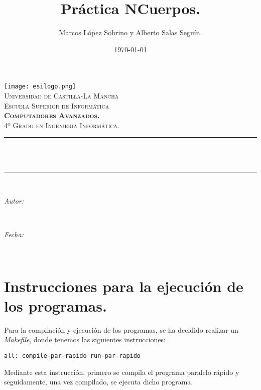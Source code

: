 \documentclass[11pt]{article}
\title{Práctica NCuerpos.}							%
\author{Marcos López Sobrino y Alberto Salas Seguín.}							%
\date{\today}											%
\makeatletter
\newcommand{\subject}{Computadores Avanzados.}						%
\newcommand{\course}{4º Grado en Ingeniería Informática.}		%
\newcommand{\dateText}{Fecha:}
\newcommand{\dateText}{Date:}
\let\thetitle\@title
\let\theauthor\@author
\let\thedate\@date
\makeatother
\begin{document}
\begin{titlepage}
	\centering
    \texttt{[image: esilogo.png]}\\[1.0 cm]	%
    \textsc{\LARGE Universidad de Castilla-La Mancha}\\[0.5 cm]	%
    \textsc{\LARGE Escuela Superior de Informática}\\[2.0 cm]
	\textsc{\Large \textbf{\subject}}\\[0.5 cm]				%
	\textsc{\large \course}\\[0.5 cm]						%
	\rule{\linewidth}{0.2 mm} \\[0.4 cm]
	{ \huge \bfseries \thetitle}\\
	\rule{\linewidth}{0.2 mm} \\[1.5 cm]
	
	\begin{minipage}{0.4\textwidth}
		\begin{flushleft} \large
			\emph{Autor:}\\
			\textbf{\theauthor}
			\end{flushleft}
			\end{minipage}~
			\begin{minipage}{0.4\textwidth}
			\begin{flushright} \large
			\emph{\dateText} \\
			\thedate
		\end{flushright}
	\end{minipage}\\[1.5 cm]
 
	\vfill
	
\end{titlepage}

\tableofcontents
\newpage

\section{Instrucciones para la ejecución de los programas.}
Para la compilación y ejecución de los programas, se ha decidido realizar un \textit{Makefile}, donde tenemos las siguientes instrucciones:
\begin{lstlisting}[style=C, numbers=none]
all: compile-par-rapido run-par-rapido
\end{lstlisting}
Mediante esta instrucción, primero se compila el programa paralelo rápido y seguidamente, una vez compilado, se ejecuta dicho programa. \\
\end{document}
